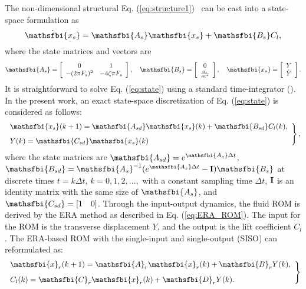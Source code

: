 \documentclass{jfm}
\def\vec#1{\mbox{\boldmath $#1$}}
\begin{document}
The non-dimensional structural Eq. \mbox{(\ref{eq:structure1}) }
can be cast into a state-space formulation as
\begin{equation}
 \dot{\mathsfbi{x_{s}}}=\mathsfbi{A_{s}}\mathsfbi{x_{s}}+\mathsfbi{B_{s}}C_l,
\label{eq:state}
\end{equation} 
where the state matrices and vectors are
\[ 
	\mathsfbi{A_{s}}=\left[ \begin{array}{cc}
	0 & 1\\
	 -(2\pi F_{s})^2 &-4\zeta\pi F_{s}      
 	\end{array} \right], \quad
 	\mathsfbi{B_{s}}=\left[ \begin{array}{c}
 	0 \\
 	\frac{a_{s}}{m^{*}}
	\end{array}  \right], \quad
	\mathsfbi{x_{s}}=\left[ \begin{array}{c}
 	Y \\
 	\dot{Y}
	\end{array}  \right].
 \] 
It is straightforward to solve Eq. (\ref{eq:state}) using a standard time-integrator (\cite{Yao2016_JFS}). In the present work, an exact state-space discretization of Eq. (\ref{eq:state}) is considered as follows:
\begin{equation}
\left. \begin{array}{ll}
\displaystyle \mathsfbi{x_{s}}(k+1)=\mathsfbi{A_{sd}}\mathsfbi{x_{s}}(k)+\mathsfbi{B_{sd}}C_l(k),  \\[8pt]
\displaystyle Y(k)=\mathsfbi{C_{sd}}\mathsfbi{x_{s}}(k)
\end{array}\right\},
\label{eq:discrete_structure}
\end{equation}
where the state matrices are $\mathsfbi{A_{sd}}=e^{\mathsfbi{A_{s}}\Delta t}$, $\mathsfbi{B_{sd}}={\mathsfbi{A_{s}}}^{-1}(e^{\mathsfbi{A_{s}}\Delta t}-\vec{\mathrm{I}})\mathsfbi{B_s}$ 
at discrete times $t=k\Delta t$, 
$k=0,1,2,...,$ with a constant sampling time $\Delta t$, $\vec{\mathrm{I}}$ is 
an identity matrix with the same size of $\mathsfbi{A_{s}}$, and 
$\mathsfbi{C_{sd}}=[1 \quad 0]$. 
%
Through the input-output dynamics, the fluid ROM is derived by the ERA method 
as described in Eq. (\ref{eq:ERA_ROM}). 
The input for the ROM  is the transverse displacement $Y$, and the output 
is the lift coefficient $C_l$. The ERA-based ROM with the single-input and single-output (SISO) can reformulated as:
\begin{equation}
\left. \begin{array}{ll}

\displaystyle \mathsfbi{x}_{r}(k+1)=\mathsfbi{A}_{r}\mathsfbi{x}_{r}(k)+\mathsfbi{B}_{r}Y(k),  \\[8pt]

\displaystyle C_l(k)=\mathsfbi{C}_{r}\mathsfbi{x}_{r}(k)+\mathsfbi{D}_{r}Y(k).
\end{array}\right\}
 \label{eq:ERA_ROM2}
\end{equation}  
\end{document}
